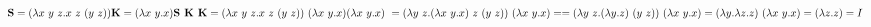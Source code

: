 \documentclass[a4paper,17pt]{extarticle}
\begin{document}
$
\textbf{S} =  (\lambda x\ y\ z.x\ z\ (y\ z)) \newline
\textbf{K} = (\lambda x\ y.x) \newline \newline
\textbf{S K K} = (\lambda x\ y\ z.x\ z\ (y\ z))\ (\lambda x\ y.x) (\lambda x\ y.x)\
= (\lambda y\ z.(\lambda x\ y.x)\ z\ (y\ z))\ (\lambda x\ y.x) = 
= (\lambda y\ z.(\lambda y.z)\ (y\ z))\ (\lambda x\ y.x) 
= (\lambda y.\lambda z.z)\ (\lambda x\ y.x) = (\lambda z.z) = I
$
\end{document}

